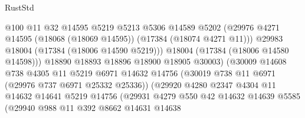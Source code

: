 \begin{lexlean}{RustStd}
\begin{coremodule}
                                      @100
                                      @11
                                      @32
                                      @14595
                                      @5219
                                      @5213
                                      @5306
                                      @14589
                                      @5202
                                      (@29976
                                        @4271
                                        @14595
                                        (@18068 (@18069 @14595))
                                        (@17384 (@18074 @4271 @11)))
                                      @29983
                                      @18004
                                      (@17384 (@18006 @14590 @5219)))
                                    @18004
                                    (@17384 (@18006 @14580 @14598)))
                                  @18890
                                  @18893
                                  @18896
                                  @18900
                                  @18905
                                  @30003)
                                (@30009
                                  @14608
                                  @738
                                  @4305
                                  @11
                                  @5219
                                  @6971
                                  @14632
                                  @14756
                                  (@30019 @738 @11 @6971 (@29976 @737 @6971 @25332 @25336))
                                  (@29920
                                    @4280
                                    @2347
                                    @4304
                                    @11
                                    @14632
                                    @14641
                                    @5219
                                    @14756
                                    (@29931
                                      @4279
                                      @550
                                      @42
                                      @14632
                                      @14639
                                      @5585
                                      (@29940
                                        @988
                                        @11
                                        @392
                                        @8662
                                        @14631
                                        @14638

\end{coremodule}
\end{lexlean}
